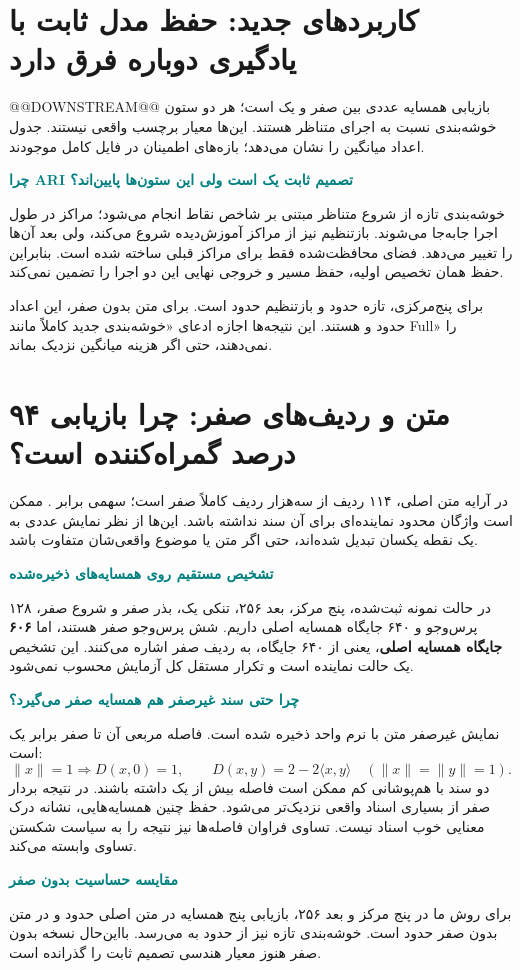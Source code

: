 \documentclass[11pt,a4paper]{article}
\newcommand{\lesson}[1]{\clearpage\section{#1}}
\newcommand{\sub}[1]{\par\vspace{3pt}\textbf{\textcolor{teal}{#1}}\par}
\begin{document}
\lesson{کاربردهای جدید: حفظ مدل ثابت با یادگیری دوباره فرق دارد}
@@DOWNSTREAM@@
بازیابی همسایه عددی بین صفر و یک است؛ هر دو ستون خوشه‌بندی  نسبت به اجرای متناظر  هستند. این‌ها معیار برچسب واقعی نیستند. جدول اعداد میانگین را نشان می‌دهد؛ بازه‌های اطمینان در فایل کامل موجودند.

\sub{چرا ARI تصمیم ثابت یک است ولی این ستون‌ها پایین‌اند؟}
خوشه‌بندی تازه از شروع متناظر مبتنی بر شاخص نقاط انجام می‌شود؛ مراکز در طول اجرا جابه‌جا می‌شوند. بازتنظیم نیز از مراکز آموزش‌دیده شروع می‌کند، ولی بعد آن‌ها را تغییر می‌دهد. فضای محافظت‌شده فقط برای مراکز قبلی ساخته شده است. بنابراین حفظ همان تخصیص اولیه، حفظ مسیر و خروجی نهایی این دو اجرا را تضمین نمی‌کند.

برای  پنج‌مرکزی،  تازه حدود  و بازتنظیم حدود  است. برای متن بدون صفر، این اعداد حدود  و  هستند. این نتیجه‌ها اجازه ادعای «خوشه‌بندی جدید کاملاً مانند Full» را نمی‌دهند، حتی اگر هزینه میانگین نزدیک بماند.

\lesson{متن و ردیف‌های صفر: چرا بازیابی ۹۴ درصد گمراه‌کننده است؟}
در آرایه متن اصلی، ۱۱۴ ردیف از سه‌هزار ردیف کاملاً صفر است؛ سهمی برابر . ممکن است واژگان محدود نماینده‌ای برای آن سند نداشته باشد. این‌ها از نظر نمایش عددی به یک نقطه یکسان تبدیل شده‌اند، حتی اگر متن یا موضوع واقعی‌شان متفاوت باشد.

\sub{تشخیص مستقیم روی همسایه‌های ذخیره‌شده}
در حالت نمونه ثبت‌شده، پنج مرکز، بعد ۲۵۶، تنکی یک، بذر صفر و شروع صفر، ۱۲۸ پرس‌وجو و ۶۴۰ جایگاه همسایه اصلی داریم. شش پرس‌وجو صفر هستند، اما \textbf{۶۰۶ جایگاه همسایه اصلی}، یعنی  از ۶۴۰ جایگاه، به ردیف صفر اشاره می‌کنند. این تشخیص یک حالت نماینده است و تکرار مستقل کل آزمایش محسوب نمی‌شود.

\sub{چرا حتی سند غیرصفر هم همسایه صفر می‌گیرد؟}
نمایش غیرصفر متن با نرم واحد ذخیره شده است. فاصله مربعی آن تا صفر برابر یک است:
\[
 \|x\|=1\Rightarrow D(x,0)=1,
 \qquad D(x,y)=2-2\langle x,y\rangle\quad(\|x\|=\|y\|=1).
\]
دو سند با هم‌پوشانی کم ممکن است فاصله بیش از یک داشته باشند. در نتیجه بردار صفر از بسیاری اسناد واقعی نزدیک‌تر می‌شود. حفظ چنین همسایه‌هایی، نشانه درک معنایی خوب اسناد نیست. تساوی فراوان فاصله‌ها نیز نتیجه را به سیاست شکستن تساوی وابسته می‌کند.

\sub{مقایسه حساسیت بدون صفر}
برای روش ما در پنج مرکز و بعد ۲۵۶، بازیابی پنج همسایه در متن اصلی حدود  و در متن بدون صفر حدود  است. خوشه‌بندی تازه نیز از حدود  به  می‌رسد. بااین‌حال نسخه بدون صفر هنوز معیار هندسی تصمیم ثابت را گذرانده است.
\end{document}
